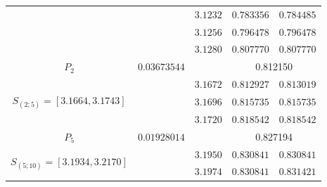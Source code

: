 \documentclass[10pt]{amsart}
\numberwithin{equation}{section}
\theoremstyle{definition}
\newcommand\intpx[2]{S_{(#1;#2)}}
\begin{document}
\begin{longtable}{|c|c|c|c|c|}
  &  &  $3.1232 $  &  $ 0.783356 $ & $ 0.784485 $ \\
  &  &  $3.1256 $  &  $ 0.796478 $ & $ 0.796478 $ \\
  &  &  $3.1280 $  &  $ 0.807770 $ & $ 0.807770 $ \\
  \hline
          $P_2$ & $0.03673544$ & & \multicolumn{2}{c|}{0.812150}  \\
  \hline
  \multirow{3}{*}{ $ \intpx{2}{5} = [3.1664,3.1743] $ } 
  &  &  $3.1672 $  &  $ 0.812927 $ & $ 0.813019 $ \\
  &  &  $3.1696 $  &  $ 0.815735 $ & $ 0.815735 $ \\
  &  &  $3.1720 $  &  $ 0.818542 $ & $ 0.818542 $ \\
  \hline
        $P_5$ & $0.01928014$ & & \multicolumn{2}{c|}{0.827194}  \\
    \hline
  \multirow{11}{*}{  $ \intpx{5}{10} =  [3.1934,3.2170] $ } 
  &  &  $3.1950 $  &  $ 0.830841 $ & $ 0.830841 $ \\
  &  &  $3.1974 $  &  $ 0.830841 $ & $ 0.831421 $ \\

\end{longtable}
\end{document}
